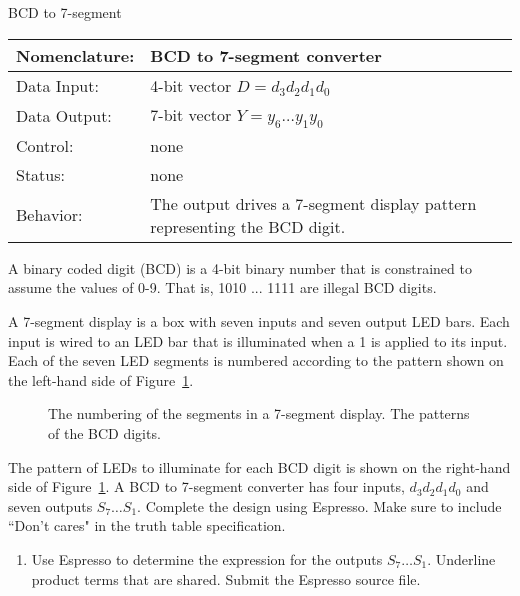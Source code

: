 \begin{enumerate}
            \begin{buildingblock}{BCD to 7-segment}
                \label{page:7seg}
                \begin{tabular}{|l|p{3.5in}|} \hline
                    Nomenclature:  & BCD to 7-segment converter                \\ \hline
                    Data Input:    & 4-bit vector $D=d_3 d_2 d_1 d_0$  \\ \hline
                    Data Output:   & 7-bit vector $Y=y_6 \ldots y_1 y_0$    \\ \hline
                    Control:       & none                                   \\ \hline
                    Status:        & none                                   \\ \hline
                    Behavior:      & The output drives a 7-segment display pattern
                    representing the BCD digit.  \\ \hline
                \end{tabular}
            \end{buildingblock}

            A binary coded digit (BCD) is a 4-bit binary number that is constrained
            to assume the values of 0-9. That is, 1010 ... 1111 are illegal BCD digits.

            A 7-segment display is a box with seven inputs and seven output LED bars.
            Each input is wired to an LED bar that is illuminated when a 1 is applied
            to its input.
            Each of the seven LED segments is numbered according to the pattern shown
            on the left-hand side of Figure~\ref{fig:BCD}.

            \begin{figure}[ht]
                \caption{The numbering of the segments in a 7-segment display.
                The patterns of the BCD digits.}
                \label{fig:BCD}
            \end{figure}

            The pattern of LEDs to illuminate for each BCD digit is shown on the
            right-hand side of Figure~\ref{fig:BCD}.  A BCD to 7-segment converter
            has four inputs, $d_3 d_2 d_1 d_0$ and seven outputs $S_7 \ldots S_1$.
            Complete the design using Espresso.  Make sure to include ``Don't cares"
            in the truth table specification.
            \begin{enumerate}
                \item Use Espresso to determine the \SOPmin expression for the outputs
                    $S_7 \ldots S_1$.  Underline product terms that are shared.
                    Submit the Espresso source file.


\end{enumerate}
\end{enumerate}
